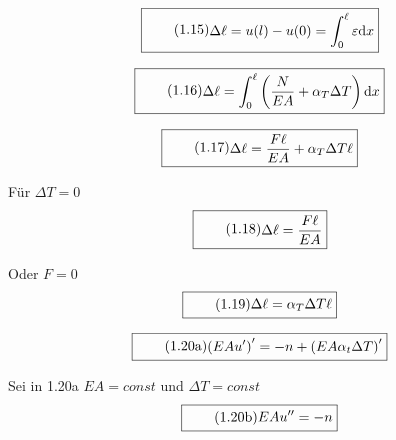 \documentclass[11pt]{article}
\newcommand{\1}{ {\mathds{1}} }
\begin{document}
		\begin{equation}
			\boxed{
				\tag{1.15}
				\begin{split}
					\Delta \ell
					=
					u(l)
					-
					u(0)
					=
					\int_{0}^{\ell}
					\varepsilon
					\text{d}x
				\end{split}
			}
		\end{equation}
		 
		\begin{equation}
			\boxed{
				\tag{1.16}
				\begin{split}
					\Delta \ell
					=
					\int_{0}^{\ell}
					\left(
						\frac{N}{EA}
						+
						\alpha_T \Delta T
					\right)
					\text{d}x
				\end{split}
			}
		\end{equation}

		\begin{equation}
			\boxed{
				\tag{1.17}
				\begin{split}
					\Delta \ell
					=
					\frac{F\ell}{EA}
					+
					\alpha_T \Delta T \ell
				\end{split}
			}
		\end{equation}


		Für $\Delta T = 0$
		\begin{equation}
			\boxed{
				\tag{1.18}
				\begin{split}
					\Delta \ell
					=
					\frac{F\ell}{EA}
				\end{split}
			}
		\end{equation}

		Oder $F = 0$
		\begin{equation}
			\boxed{
				\tag{1.19}
				\begin{split}
					\Delta \ell
					=
					\alpha_T \Delta T \ell
				\end{split}
			}
		\end{equation}
		
		\begin{equation}
			\boxed{
				\tag{1.20a}
				\begin{split}
					\left(
						EA u'
					\right)'
					=
					-n
					+
					\left(
						EA \alpha_t \Delta T
					\right)'
				\end{split}
			}
		\end{equation}

		Sei in 1.20a $EA = const$ und $\Delta T = const$
		\begin{equation}
			\boxed{
				\tag{1.20b}
				\begin{split}
					EA u''
					=
					-n
				\end{split}
			}
		\end{equation}
\end{document}
